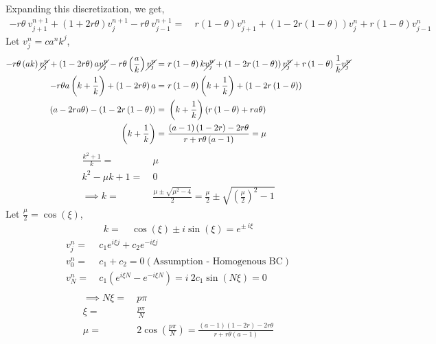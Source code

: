 \documentclass[11pt]{article}
\newcommand{\vnj}{v^{n}_j}
\newcommand{\vnpj}{v^{n+1}_j}
\newcommand{\vnjp}{v^{n}_{j+1}}
\newcommand{\vnjm}{v^{n}_{j-1}}
\newcommand{\vnpjp}{v^{n+1}_{j+1}}
\newcommand{\vnpjm}{v^{n+1}_{j-1}}
\newcommand{\bra}[1]{\left(#1\right)}
\begin{document}
\begin{enumerate}
\begin{enumerate}
      Expanding this discretization, we get,
      \begin{align*}
      -r\theta \ \vnpjp + \left(1+2r\theta\right)\vnpj - r\theta \ \vnpjm = & \ r\left(1-\theta \right)\vnjp + \left(1-2r\left(1-\theta \right)\right)\vnj + r\left(1-\theta\right)\vnjm
      \end{align*}
      Let $\vnj = ca^n k^j$, 
      \begin{align*}
      -r\theta \bra{ak}\cancel{\vnj} + \bra{1-2r\theta}a\cancel{\vnj} -r\theta \bra{\frac{a}{k}}\cancel{\vnj} = & \ r\bra{1-\theta} k\cancel{\vnj} + \bra{1-2r\bra{1-\theta}}\cancel{\vnj} + r\bra{1-\theta}\frac{1}{k} \cancel{\vnj} \\
      -r\theta a\bra{k + \frac{1}{k}} + \bra{1-2r\theta}a = &\ r\bra{1-\theta}\bra{k + \frac{1}{k}} + \bra{1-2r\bra{1-\theta}}\\
      \bra{a-2ra\theta} - \bra{1-2r\bra{1-\theta}} = & \ \bra{k + \frac{1}{k}}\bra{r\bra{1-\theta} + ra\theta} \\
      \bra{k+\frac{1}{k}} = & \ \frac{\bra{a-1}\bra{1-2r}-2r\theta}{r+r\theta\bra{a-1}} = \mu \\
      \end{align*}
      \begin{align*}
      \frac{k^2 + 1}{k} =& \ \mu \\
      k^2 -\mu k + 1 = & \ 0 \\
      \implies k = & \ \frac{\mu \pm \sqrt{\mu^2-4}}{2} = \frac{\mu}{2} \pm \sqrt{\bra{\frac{\mu}{2}}^2 - 1}
      \end{align*}
      Let $\frac{\mu}{2} = \cos\bra{\xi}$, 
      \begin{align*}
      k = & \ \cos\bra{\xi} \pm i \sin\bra{\xi} = e^{\pm \ i \xi}
      \end{align*}
      \begin{align*}
      \vnj = & \ c_1 e^{i\xi j} + c_2 e^{-i\xi j} \\
      v^{n}_{0} = & \ c_1 + c_2 = 0 \bra{\text{Assumption - Homogenous BC}} \\
      v^{n}_{N}= & \ c_1\bra{e^{i\xi N} - e^{-i\xi N}} = i \ 2c_1 \sin\bra{N \xi} = 0 \\
      \end{align*}
      \begin{align*}
      \implies N\xi = & \ p\pi \\
      \xi = & \ \frac{p\pi}{N}  \\
      \mu = & \ 2\cos\bra{\frac{p\pi}{N}} = \frac{\bra{a-1}\bra{1-2r}-2r\theta}{r+r\theta\bra{a-1}} \\

\end{align*}
\end{enumerate}
\end{enumerate}
\end{document}
